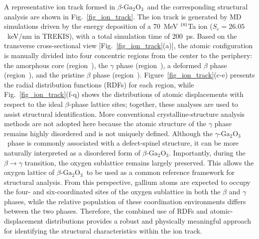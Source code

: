 \documentclass[aip,graphicx,amsmath,amssymb]{revtex4-1}
\newcommand{\ga}{$\text{Ga}_2\text{O}_3$}
\begin{document}
A representative ion track formed in $\beta$-\ga\ and the corresponding structural
analysis are shown in Fig.~\ref{fig_ion_track}.
The ion track is generated by MD simulations driven by the energy deposition of a
70~MeV $^{181}$Ta ion ($S_e = 26.05$~keV/nm in TREKIS), with a total simulation time of 200~ps.
Based on the transverse cross-sectional view
[Fig.~\ref{fig_ion_track}(a)], the atomic configuration is manually divided into four
concentric regions from the center to the periphery:
the amorphous core (region~),
the $\gamma$ phase (region~),
a deformed $\beta$ phase (region~),
and the pristine $\beta$ phase (region~).
Figure~\ref{fig_ion_track}(c-e) presents the radial distribution functions (RDFs) for each
region, while Fig.~\ref{fig_ion_track}(f-q) shows the distributions of atomic displacements
with respect to the ideal $\beta$-phase lattice sites; together, these analyses are used
to assist structural identification. 
More conventional crystalline-structure analysis methods are not adopted here because
the atomic structure of the $\gamma$ phase remains highly disordered and is not uniquely
defined.\cite{ratcliff_tackling_2022} 
Although the $\gamma$-\ga\ phase is commonly associated with a defect-spinel structure,
it can be more naturally interpreted as a disordered form of $\beta$-\ga.\cite{huang_nature_2024} 
Importantly, during the $\beta \to \gamma$ transition, the oxygen sublattice remains
largely preserved. 
This allows the oxygen lattice of $\beta$-\ga\ to be used as a common reference framework
for structural analysis.
From this perspective, gallium atoms are expected to occupy the four- and six-coordinated
sites of the oxygen sublattice in both the $\beta$ and $\gamma$ phases, while the relative
population of these coordination environments differs between the two phases.
Therefore, the combined use of RDFs and atomic-displacement distributions provides a
robust and physically meaningful approach for identifying the structural characteristics
within the ion track.
\end{document}
